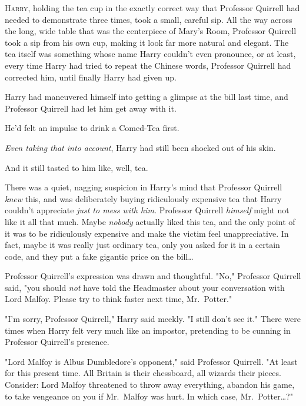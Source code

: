 
\lettrine{H}{arry}, holding 
the tea cup in the exactly correct way that Professor Quirrell had needed to 
demonstrate three times, took a small, careful sip. All the way across the 
long, wide table that was the centerpiece of Mary's Room, Professor Quirrell 
took a sip from his own cup, making it look far more natural and elegant. The 
tea itself was something whose name Harry couldn't even pronounce, or at least, 
every time Harry had tried to repeat the Chinese words, Professor Quirrell had 
corrected him, until finally Harry had given up.

Harry had maneuvered himself into getting a glimpse at the bill last time, and 
Professor Quirrell had let him get away with it.

He'd felt an impulse to drink a Comed-Tea first.

\emph{Even taking that into account}, Harry had still been shocked out of his 
skin.

And it still tasted to him like, well, tea.

There was a quiet, nagging suspicion in Harry's mind that Professor Quirrell 
\emph{knew} this, and was deliberately buying ridiculously expensive tea that 
Harry couldn't appreciate \emph{just to mess with him.} Professor Quirrell 
\emph{himself} might not like it all that much. Maybe \emph{nobody} actually 
liked this tea, and the only point of it was to be ridiculously expensive and 
make the victim feel unappreciative. In fact, maybe it was really just ordinary 
tea, only you asked for it in a certain code, and they put a fake gigantic 
price on the bill{\ldots}

Professor Quirrell's expression was drawn and thoughtful. "No," Professor 
Quirrell said, "you should \emph{not} have told the Headmaster about your 
conversation with Lord Malfoy. Please try to think faster next time, 
Mr.~Potter."

"I'm sorry, Professor Quirrell," Harry said meekly. "I still don't see it." 
There were times when Harry felt very much like an impostor, pretending to be 
cunning in Professor Quirrell's presence.

"Lord Malfoy is Albus Dumbledore's opponent," said Professor Quirrell. "At 
least for this present time. All Britain is their chessboard, all wizards their 
pieces. Consider: Lord Malfoy threatened to throw away everything, abandon his 
game, to take vengeance on you if Mr.~Malfoy was hurt. In which case, 
Mr.~Potter{\ldots}?"

